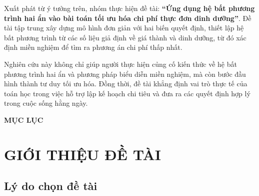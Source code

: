 \documentclass[12pt,a4paper]{article}
\begin{document}
Xuất phát từ ý tưởng trên, nhóm thực hiện đề tài:
\textbf{``Ứng dụng hệ bất phương trình hai ẩn vào bài toán tối ưu hóa chi phí thực đơn dinh dưỡng''}. 
Đề tài tập trung xây dựng mô hình đơn giản với hai biến quyết định, thiết lập hệ bất phương trình từ các số liệu giả định về giá thành và dinh dưỡng, từ đó xác định miền nghiệm để tìm ra phương án chi phí thấp nhất.

Nghiên cứu này không chỉ giúp người thực hiện củng cố kiến thức về hệ bất phương trình hai ẩn và phương pháp biểu diễn miền nghiệm, mà còn bước đầu hình thành tư duy tối ưu hóa. Đồng thời, đề tài khẳng định vai trò thực tế của toán học trong việc hỗ trợ lập kế hoạch chi tiêu và đưa ra các quyết định hợp lý trong cuộc sống hằng ngày.





\newpage

\begin{center}
    \textbf{\Large MỤC LỤC}
\end{center}

\vspace{0.5cm}

\tableofcontents

\newpage




\newpage

\section{GIỚI THIỆU ĐỀ TÀI}


\subsection{Lý do chọn đề tài}
\end{document}
